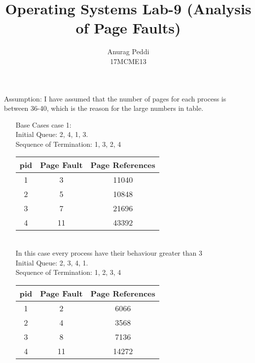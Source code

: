 \documentclass[a4paper,12pt]{article}
\title{Operating Systems Lab-9 (Analysis of Page Faults)}
\author{Anurag Peddi\\17MCME13}
\date{}
\begin{document}
  \maketitle
  Assumption: I have assumed that the number of pages for each process is between 36-40, which is the reason
  for the large numbers in table.\\
  \begin{enumerate}
    \item[Base Cases]
      case 1:\\
      Initial Queue: 2, 4, 1, 3.\\
      Sequence of Termination: 1, 3, 2, 4\\
      \begin{table}[h!]
        \begin{center}
          \begin{tabular}{c|c|c}
            \textbf{pid} & \textbf{Page Fault} & \textbf{Page References} \\
            \hline
            1   & 3   & 11040 \\
            2   & 5   & 10848 \\
            3   & 7   & 21696 \\
            4   & 11  & 43392 \\
          \end{tabular}
        \end{center}
      \end{table}\\
      In this case every process have their behaviour greater than 3\\
      Initial Queue: 2, 3, 4, 1.\\
      Sequence of Termination: 1, 2, 3, 4\\
      \begin{table}[h!]
        \begin{center}
          \begin{tabular}{c|c|c}
            \textbf{pid} & \textbf{Page Fault} & \textbf{Page References} \\
            \hline
            1   & 2   & 6066 \\
            2   & 4   & 3568 \\
            3   & 8   & 7136 \\
            4   & 11  & 14272 \\
          \end{tabular}
        \end{center}
      \end{table}

\end{enumerate}
\end{document}
